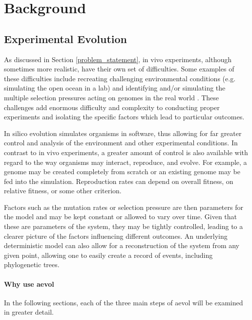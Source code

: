 \chapter{Background}\label{ch:background}

\section{Experimental Evolution}
As discussed in Section \ref{problem_statement}, in vivo experiments, although sometimes more realistic, have their own set of difficulties. Some examples of these difficulties include recreating challenging environmental conditions (e.g. simulating the open ocean in a lab) and identifying and/or simulating the multiple selection pressures acting on genomes in the real world \cite{Batut.2013}. These challenges add enormous difficulty and complexity to conducting proper experiments and isolating the specific factors which lead to particular outcomes. 

In silico evolution simulates organisms in software, thus allowing for far greater control and analysis of the environment and other experimental conditions. In contrast to in vivo experiments, a greater amount of control is also available with regard to the way organisms may interact, reproduce, and evolve. For example, a genome may be created completely from scratch or an existing genome may be fed into the simulation. Reproduction rates can depend on overall fitness, on relative fitness, or some other criterion.

Factors such as the mutation rates or selection pressure are then parameters for the model and may be kept constant or allowed to vary over time. Given that these are parameters of the system, they may be tightly controlled, leading to a clearer picture of the factors influencing different outcomes. An underlying deterministic model can also allow for a reconstruction of the system from any given point, allowing one to easily create a record of events, including phylogenetic trees. 

\subsubsection{Why use aevol}
In the following sections, each of the three main steps of aevol will be examined in greater detail.

